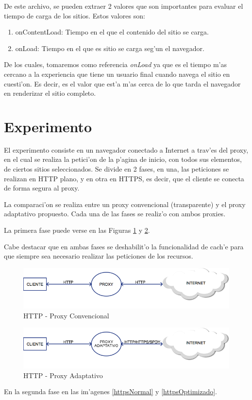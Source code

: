 De este archivo, se pueden extraer 2 valores que son importantes para evaluar el tiempo de carga de los sitios. Estos valores son:
\begin{enumerate}
\item onContentLoad: Tiempo en el que el contenido del sitio se carga.
\item onLoad: Tiempo en el que es sitio se carga seg'un el navegador.
\end{enumerate}

De los cuales, tomaremos como referencia \emph{onLoad} ya que es el tiempo m'as cercano a la experiencia que tiene un usuario final cuando navega el sitio en cuesti'on. Es decir, es el valor que est'a m'as cerca de lo que tarda el navegador en renderizar el sitio completo.
\clearpage
\section{Experimento}

El experimento consiste en un navegador conectado a Internet a trav'es del proxy, en el cual se realiza la petici'on de la p'agina de inicio, con todos sus elementos, de ciertos sitios seleccionados. Se divide en 2 fases, en una, las peticiones se realizan en HTTP plano, y en otra en HTTPS, es decir, que el cliente se conecta de forma segura al proxy.

La comparaci'on se realiza entre un proxy convencional (transparente) y el proxy adaptativo propuesto.
Cada una de las fases se realiz'o con ambos proxies.

La primera fase puede verse en las Figuras \ref{httpNormal} y \ref{httpOptimizado}.

Cabe destacar que en ambas fases se deshabilit'o la funcionalidad de cach'e para que siempre sea necesario realizar las peticiones de los recursos.

\begin{figure}[h]
  	\centering
	\includegraphics[width=\textwidth]{img/httpNormal}
	\caption{\small HTTP - Proxy Convencional}
	\label{httpNormal}
\end{figure}

\begin{figure}[h]
  	\centering
	\includegraphics[width=\textwidth]{img/httpOptimizado}
	\caption{\small HTTP - Proxy Adaptativo}
	\label{httpOptimizado}
\end{figure}
\clearpage
En la segunda fase en las im'agenes \ref{httpsNormal} y \ref{httpsOptimizado}.

